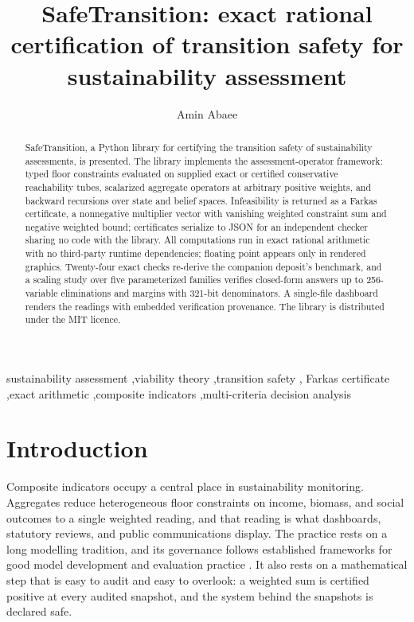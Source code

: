 \documentclass[3p,11pt]{elsarticle}
\begin{document}
\begin{frontmatter}

\title{SafeTransition: exact rational certification of transition safety for
sustainability assessment}

\author[aff]{Amin Abaee}
\address[aff]{Independent Researcher,
\href{https://orcid.org/0000-0002-0019-1842}{ORCID: 0000-0002-0019-1842},
\href{mailto:amin\_abaee@ut.ac.ir}{amin\_abaee@ut.ac.ir}}

\begin{abstract}
SafeTransition, a Python library for certifying the transition safety of
sustainability assessments, is presented. The library implements the
assessment-operator framework: typed floor constraints evaluated on
supplied exact or certified conservative reachability tubes, scalarized
aggregate operators at arbitrary positive
weights, and backward recursions over state and belief spaces. Infeasibility
is returned as a Farkas certificate, a nonnegative multiplier vector with
vanishing weighted constraint sum and negative weighted bound; certificates
serialize to JSON for an independent checker sharing no code with the
library. All computations run in exact rational arithmetic
with no third-party runtime dependencies; floating point appears only in
rendered graphics. Twenty-four exact checks re-derive the companion deposit's benchmark,
and a scaling study over five parameterized families verifies
closed-form answers up to 256-variable eliminations and margins with
321-bit denominators. A single-file dashboard renders
the readings with embedded verification provenance. The library is
distributed under the MIT licence.
\end{abstract}

\begin{keyword}
sustainability assessment \sep viability theory \sep transition safety \sep
Farkas certificate \sep exact arithmetic \sep composite indicators
\sep multi-criteria decision analysis
\end{keyword}

\end{frontmatter}

\section{Introduction}\label{sec:introduction}

Composite indicators occupy a central place in sustainability monitoring.
Aggregates reduce heterogeneous floor constraints on income, biomass, and
social outcomes to a single weighted reading, and that reading is what
dashboards, statutory reviews, and public communications display. The
practice rests on a long modelling tradition, and its governance follows
established frameworks for good model development and evaluation practice
\citep{Jakeman2006}. It also rests on a mathematical step that
is easy to audit and easy to overlook: a weighted sum is certified positive
at every audited snapshot, and the system behind the snapshots is declared
safe.
\end{document}
